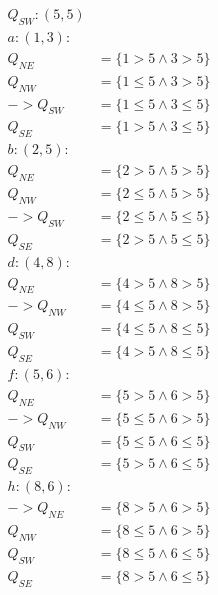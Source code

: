 \documentclass{report}
\begin{document}
  \begin{multicols}{2}
    \begin{equation*}
      \begin{split}
      Q_{SW} : (5, 5) & \\
        a : (1, 3) : & \\
             Q_{NE} & = \{1 > 5 \land 3 > 5\} \\
             Q_{NW} & = \{1 \leq 5 \land 3 > 5\} \\
             ->Q_{SW} & = \{1 \leq 5 \land 3 \leq 5\} \\
             Q_{SE} & = \{1 > 5 \land 3 \leq 5\} \\
        b : (2, 5) : & \\
             Q_{NE} & = \{2 > 5 \land 5 > 5\} \\
             Q_{NW} & = \{2 \leq 5 \land 5 > 5\} \\
             ->Q_{SW} & = \{2 \leq 5 \land 5 \leq 5\} \\
             Q_{SE} & = \{2 > 5 \land 5 \leq 5\} \\
        d : (4, 8) : \\
             Q_{NE} & = \{4 > 5 \land 8 > 5\} \\
             ->Q_{NW} & = \{4 \leq 5 \land 8 > 5\} \\
             Q_{SW} & = \{4 \leq 5 \land 8 \leq 5\} \\
             Q_{SE} & = \{4 > 5 \land 8 \leq 5\} \\
        f : (5, 6) : \\
             Q_{NE} & = \{5 > 5 \land 6 > 5\} \\
             ->Q_{NW} & = \{5 \leq 5 \land 6 > 5\} \\
             Q_{SW} & = \{5 \leq 5 \land 6 \leq 5\} \\
             Q_{SE} & = \{5 > 5 \land 6 \leq 5\} \\
        h : (8, 6) : \\
             ->Q_{NE} & = \{8 > 5 \land 6 > 5\} \\
             Q_{NW} & = \{8 \leq 5 \land 6 > 5\} \\
             Q_{SW} & = \{8 \leq 5 \land 6 \leq 5\} \\
             Q_{SE} & = \{8 > 5 \land 6 \leq 5\} \\
      \end{split}
    \end{equation*}\break
      \begin{equation*}

\end{equation*}
\end{multicols}
\end{document}
